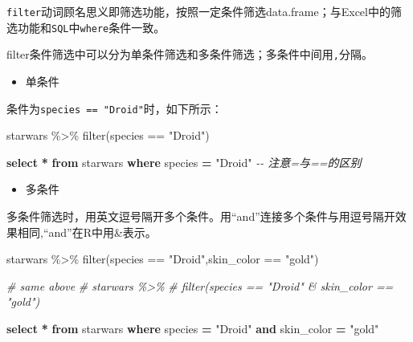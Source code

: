 \documentclass[
]{book}
\newenvironment{Shaded}{\begin{snugshade}}{\end{snugshade}}
\newcommand{\CommentTok}[1]{\textcolor[rgb]{0.56,0.35,0.01}{\textit{#1}}}
\newcommand{\FunctionTok}[1]{\textcolor[rgb]{0.00,0.00,0.00}{#1}}
\newcommand{\KeywordTok}[1]{\textcolor[rgb]{0.13,0.29,0.53}{\textbf{#1}}}
\newcommand{\NormalTok}[1]{#1}
\newcommand{\OperatorTok}[1]{\textcolor[rgb]{0.81,0.36,0.00}{\textbf{#1}}}
\newcommand{\OtherTok}[1]{\textcolor[rgb]{0.56,0.35,0.01}{#1}}
\newcommand{\SpecialCharTok}[1]{\textcolor[rgb]{0.00,0.00,0.00}{#1}}
\newcommand{\StringTok}[1]{\textcolor[rgb]{0.31,0.60,0.02}{#1}}
\providecommand{\tightlist}{%
  \setlength{\itemsep}{0pt}\setlength{\parskip}{0pt}}
\begin{document}
\texttt{filter}动词顾名思义即筛选功能，按照一定条件筛选data.frame；与Excel中的筛选功能和\texttt{SQL}中\texttt{where}条件一致。

filter条件筛选中可以分为单条件筛选和多条件筛选；多条件中间用\texttt{,}分隔。

\begin{itemize}
\tightlist
\item
  单条件
\end{itemize}

条件为\texttt{species\ ==\ "Droid"}时，如下所示：

\begin{Shaded}
\begin{Highlighting}[]
\NormalTok{starwars }\SpecialCharTok{\%\textgreater{}\%} 
  \FunctionTok{filter}\NormalTok{(species }\SpecialCharTok{==} \StringTok{"Droid"}\NormalTok{)}
\end{Highlighting}
\end{Shaded}

\begin{Shaded}
\begin{Highlighting}[]
\KeywordTok{select} \OperatorTok{*} \KeywordTok{from}\NormalTok{ starwars }\KeywordTok{where}\NormalTok{ species }\OperatorTok{=} \OtherTok{"Droid"} \CommentTok{{-}{-} 注意=与==的区别}
\end{Highlighting}
\end{Shaded}

\begin{itemize}
\tightlist
\item
  多条件
\end{itemize}

多条件筛选时，用英文逗号隔开多个条件。用``and''连接多个条件与用逗号隔开效果相同,``and''在R中用\&表示。

\begin{Shaded}
\begin{Highlighting}[]
\NormalTok{starwars }\SpecialCharTok{\%\textgreater{}\%} 
  \FunctionTok{filter}\NormalTok{(species }\SpecialCharTok{==} \StringTok{"Droid"}\NormalTok{,skin\_color }\SpecialCharTok{==} \StringTok{"gold"}\NormalTok{)}

\CommentTok{\# same above}
\CommentTok{\# starwars \%\textgreater{}\% }
\CommentTok{\#   filter(species == "Droid" \& skin\_color == "gold")}
\end{Highlighting}
\end{Shaded}

\begin{Shaded}
\begin{Highlighting}[]
\KeywordTok{select} \OperatorTok{*} \KeywordTok{from}\NormalTok{ starwars }\KeywordTok{where}\NormalTok{ species }\OperatorTok{=} \OtherTok{"Droid"} \KeywordTok{and}\NormalTok{ skin\_color }\OperatorTok{=} \OtherTok{"gold"} 
\end{Highlighting}
\end{Shaded}
\end{document}
